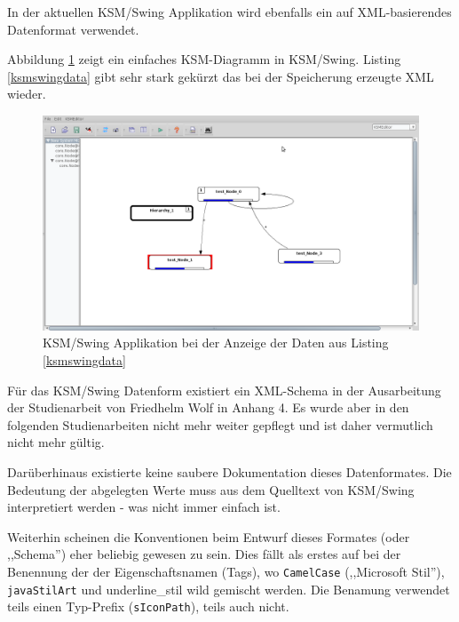 \documentclass[%
12pt,titlepage,abstracton,DIV=10]{scrreprt}
\begin{document}
In der aktuellen KSM/Swing Applikation wird ebenfalls ein auf XML-basierendes
Datenformat verwendet.

Abbildung \ref{fig:ksmswing-diagramm} zeigt ein einfaches KSM-Diagramm in
KSM/Swing. Listing \ref{ksmswingdata} gibt sehr stark gekürzt das bei der
Speicherung erzeugte XML wieder.

\begin{figure}[ht!]
  \centering
  \includegraphics[width=\textwidth]{images/ksm-swing-screenshot.png}
  \caption{KSM/Swing Applikation bei der Anzeige der Daten aus Listing
  \ref{ksmswingdata}}
  \label{fig:ksmswing-diagramm}
\end{figure}

\label{ksmswingdata}

Für das KSM/Swing Datenform existiert ein XML-Schema in der Ausarbeitung der
Studienarbeit von Friedhelm Wolf \cite{wolf05} in Anhang 4. Es wurde aber in den
folgenden Studienarbeiten nicht mehr weiter gepflegt und ist daher vermutlich
nicht mehr gültig.

Darüberhinaus existierte keine saubere Dokumentation dieses Datenformates. Die
Bedeutung der abgelegten Werte muss aus dem Quelltext von KSM/Swing
interpretiert werden - was nicht immer einfach ist.

Weiterhin scheinen die Konventionen beim Entwurf dieses Formates (oder
,,Schema'') eher beliebig gewesen zu sein.
Dies fällt als erstes auf bei der Benennung der der Eigenschaftsnamen (Tags), wo
\texttt{CamelCase} (,,Microsoft Stil''), \texttt{javaStilArt} und
underline\_stil wild gemischt werden. Die Benamung verwendet teils einen
Typ-Prefix (\texttt{sIconPath}), teils auch nicht.
\end{document}
